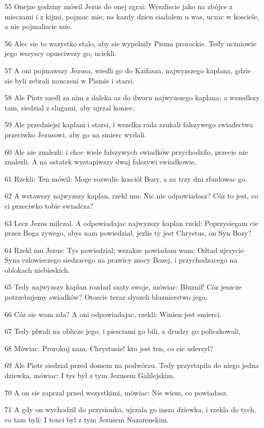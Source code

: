 \par 55 Onejze godziny mówil Jezus do onej zgrai: Wyszliscie jako na zbójce z mieczami i z kijmi, pojmac mie; na kazdy dzien siadalem u was, uczac w kosciele, a nie pojmaliscie mie.
\par 56 Alec sie to wszystko stalo, aby sie wypelnily Pisma prorockie. Tedy uczniowie jego wszyscy opusciwszy go, uciekli.
\par 57 A oni pojmawszy Jezusa, wiedli go do Kaifasza, najwyzszego kaplana, gdzie sie byli zebrali nauczeni w Pismie i starsi.
\par 58 Ale Piotr szedl za nim z daleka az do dworu najwyzszego kaplana; a wszedlszy tam, siedzial z slugami, aby ujrzal koniec.
\par 59 Ale przedniejsi kaplani i starsi, i wszelka rada szukali falszywego swiadectwa przeciwko Jezusowi, aby go na smierc wydali.
\par 60 Ale nie znalezli; i choc wiele falszywych swiadków przychodzilo, przecie nie znalezli. A na ostatek wystapiwszy dwaj falszywi swiadkowie,
\par 61 Rzekli: Ten mówil: Moge rozwalic kosciól Bozy, a za trzy dni zbudowac go.
\par 62 A wstawszy najwyzszy kaplan, rzekl mu: Nic nie odpowiadasz? Cóz to jest, co ci przeciwko tobie swiadcza?
\par 63 Lecz Jezus milczal. A odpowiadajac najwyzszy kaplan rzekl: Poprzysiegam cie przez Boga zywego, abys nam powiedzial, jezlis ty jest Chrystus, on Syn Bozy?
\par 64 Rzekl mu Jezus: Tys powiedzial; wszakze powiadam wam: Odtad ujrzycie Syna czlowieczego siedzacego na prawicy mocy Bozej, i przychodzacego na oblokach niebieskich.
\par 65 Tedy najwyzszy kaplan rozdarl szaty swoje, mówiac: Bluznil! Cóz jeszcze potrzebujemy swiadków? Otoscie teraz slyszeli bluznierstwo jego.
\par 66 Cóz sie wam zda? A oni odpowiadajac, rzekli: Winien jest smierci.
\par 67 Tedy plwali na oblicze jego, i piesciami go bili, a drudzy go policzkowali,
\par 68 Mówiac: Prorokuj nam, Chrystusie! kto jest ten, co cie uderzyl?
\par 69 Ale Piotr siedzial przed domem na podwórzu. Tedy przystapila do niego jedna dziewka, mówiac: I tys byl z tym Jezusem Galilejskim.
\par 70 A on sie zaprzal przed wszystkimi, mówiac: Nie wiem, co powiadasz.
\par 71 A gdy on wychodzil do przysionka, ujrzala go insza dziewka, i rzekla do tych, co tam byli: I tenci byl z tym Jezusem Nazarenskim.
